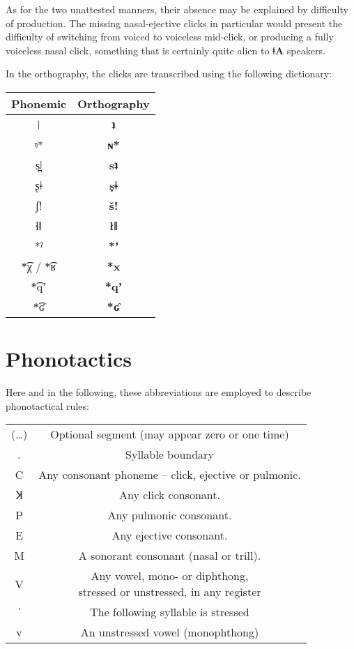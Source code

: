 \documentclass[11pt,a5paper]{book}
\newcommand{\qcn}[1]{\textcolor{AccentText}{\large\textbf{#1}}}
\newcommand{\langname}{\qcn{ǂA}}
\begin{document}
As for the two unattested manners, their absence may be explained by difficulty of production. The missing nasal-ejective clicks in particular would present the difficulty of switching from voiced to voiceless mid-click, or producing a fully voiceless nasal click, something that is certainly quite alien to \langname{} speakers.

In the orthography, the clicks are transcribed using the following dictionary:

\begin{center}
\begin{tabular}{c|c}
Phonemic & Orthography \\ \hline \hline
ǀ & \qcn{ʇ}\\
ᵑ* & \qcn{ɴ*}\\
s̪ǀ & \qcn{sʇ} \\
ʂǂ & \qcn{ṣǂ} \\
ʃ! &	\qcn{š!} \\
ɬǁ & \qcn{łǁ}\\
*ˀ & \qcn{*ʼ}\\
*͡χ / *͡ʁ & \qcn{*x} \\
*͡qʼ & \qcn{*qʼ}\\
*͡ʛ & \qcn{*ʛ}
\end{tabular}
\end{center}




\section{Phonotactics}

\newcommand{\stress}{ˈ}

Here and in the following, these abbreviations are employed to describe phonotactical rules:

\begin{center}
\begin{tabular}{cc}
	(\ldots) & Optional segment (may appear zero or one time)\\
	. & Syllable boundary \\
	C & Any consonant phoneme -- click, ejective or pulmonic.\\
	Ʞ & Any click consonant. \\
	P & Any pulmonic consonant. \\
	E & Any ejective consonant.\\
	M & A sonorant consonant (nasal or trill).\\
	V & \makecell{Any vowel, mono- or diphthong, \\stressed or unstressed, in any register} \\
 \stress{} & The following syllable is stressed \\
	v & An unstressed vowel (monophthong) 
\end{tabular}
\end{center}
\end{document}
